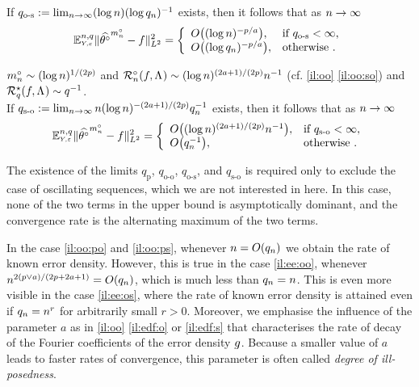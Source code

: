 \begin{il}
\begin{Liste}[]
If $q_{\text{o-s}}:=\lim_{\ssY\to\infty}(\log \ssY)(\log \ssE_{\ssY})^{-1}$ exists, then it follows that as
 $\ssY\to\infty$
\begin{equation}
\FuEx[\ssY,\ssE]{\rY,\rE}\VnormLp{\hxdfPr[\oDi{\ssY}]-\xdf}^2=\left\{\begin{array}{ll}
O\big((\log\ssY)^{-p/a}\big),& \text{if }q_{\text{o-s}}<\infty,\\
O\big((\log \ssE_{\ssY})^{-p/a}\big),& \text{otherwise }.
\end{array}\right.
\end{equation}
\item[\mylabel{il:ee:so}{\dg\bfseries{[s-o]}}] 
 $\oDi{\ssY}\sim (\log\ssY)^{1/(2p)}$ and
 $\oRa{\xdf,\iSv}\sim(\log\ssY)^{(2a+1)/(2p)}\ssY^{-1}$ (cf. \cref{il:oo}
 \ref{il:oo:so}) and $\mRa{\xdf,\iSv}\sim\ssE^{-1}$.\\
If $q_{\text{s-o}}:=\lim_{\ssY\to\infty}\ssY(\log \ssY)^{-(2a+1)/(2p)}\ssE_{\ssY}^{-1}$ exists, then it follows that as
 $\ssY\to\infty$
\begin{equation}
\FuEx[\ssY,\ssE]{\rY,\rE}\VnormLp{\hxdfPr[\oDi{\ssY}]-\xdf}^2=\left\{\begin{array}{ll}
O\big((\log \ssY)^{(2a+1)/(2p)}\ssY^{-1}\big),& \text{if }q_{\text{s-o}}<\infty,\\
O\big(\ssE_{\ssY}^{-1}\big),& \text{otherwise }.
\end{array}\right.
\end{equation}
\end{Liste}
The existence of the limits $q_{\text{p}}$, $q_{\text{o-o}}$, $q_{\text{o-s}}$, and
$q_{\text{s-o}}$ is required only to exclude the case of oscillating
sequences, which we are not interested in here. In this case, none of
the two terms in the upper bound is asymptotically dominant, and the
convergence rate is the alternating maximum of the two terms.



In the case \ref{il:oo:po} and \ref{il:oo:ps}, whenever
$\ssY = O(\ssE_{\ssY})$ we obtain the rate of known error density.
However, this is true in the case \ref{il:ee:oo}, whenever
$\ssY^{2(p\vee a)/(2p+2a+1)} = O(\ssE_{\ssY})$,
which is much less than $\ssE_{\ssY}=\ssY$. This is even more visible
in the case \ref{il:ee:os}, where the rate of known error density is
attained even if $\ssE_{\ssY}=\ssY^r$
for arbitrarily small $r > 0$.
Moreover, we emphasise the influence of the parameter $a$ as in
\cref{il:oo} \ref{il:edf:o} or \ref{il:edf:s} that
characterises the rate of decay of the Fourier coefficients of the
error density $\edf$. Because a smaller value of $a$ leads to faster rates of
convergence, this parameter is often called \textit{degree of ill-posedness}.
\ilEnd
\end{il}

